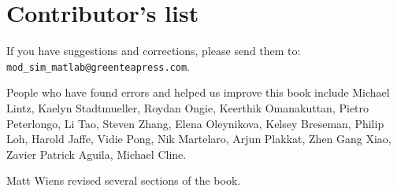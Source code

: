 \documentclass[main.tex]{subfiles}
\begin{document}
\newpage

\section*{Contributor's list}

If you have suggestions and corrections, please send them to:\\
\verb"mod_sim_matlab@greenteapress.com".


People who have found errors and helped us improve this book include
Michael Lintz, 
Kaelyn Stadtmueller, 
Roydan Ongie, 
Keerthik Omanakuttan, 
Pietro Peterlongo, 
Li Tao, 
Steven Zhang, 
Elena Oleynikova, 
Kelsey Breseman, 
Philip Loh, 
Harold Jaffe, 
Vidie Pong, 
Nik Martelaro, 
Arjun Plakkat, 
Zhen Gang Xiao, 
Zavier Patrick Aguila, 
Michael Cline.

Matt Wiens revised several sections of the book.

\newpage
\end{document}
